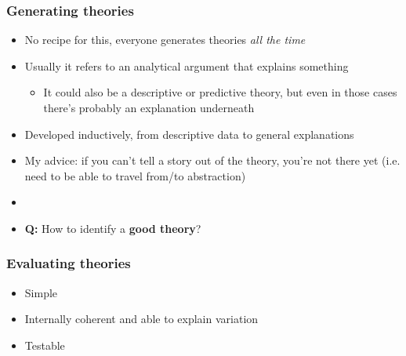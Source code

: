 \begin{frame}
\frametitle{Generating theories}
\centering

\begin{itemize}
  \item<1-> No recipe for this, everyone generates theories \textit{all the time}
  \item Usually it refers to an analytical argument that explains something
  \begin{itemize}
    \item It could also be a descriptive or predictive theory, but even in those cases there's probably an explanation underneath
  \end{itemize}
  \item Developed inductively, from descriptive data to general explanations
  \item My advice: if you can't tell a story out of the theory, you're not there yet {\small (i.e. need to be able to travel from/to abstraction)}
  \item<2->[]
  \item<2-> \textbf{Q:} How to identify a \textbf{good theory}?
\end{itemize}

\end{frame}

\begin{frame}
\frametitle{Evaluating theories}
\centering

\begin{itemize}
  \item[1.]<1-> Simple
  \item[2.]<2-> Internally coherent and able to explain variation
  \item[3.]<3-> Testable
\end{itemize}

\end{frame}

